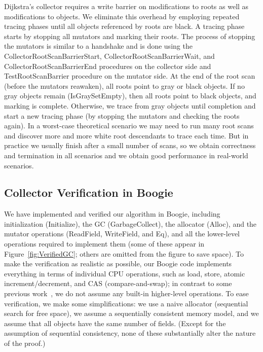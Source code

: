 Dijkstra's collector requires a write barrier on modifications to roots as well as modifications to objects. 
We eliminate this overhead by employing repeated tracing 
phases until all objects referenced by roots are black. 
A tracing phase starts by stopping all mutators and marking their roots. 
The process of stopping the mutators is similar to a handshake and is done using the CollectorRootScanBarrierStart, CollectorRootScanBarrierWait, and CollectorRootScanBarrierEnd procedures on the collector side and TestRootScanBarrier procedure on the mutator side. 
At the end of the root scan (before the mutators reawaken), all roots point to gray or black objects.
If no gray objects remain (IsGraySetEmpty), then all roots point to black objects, and marking is complete. 
Otherwise, we trace from gray objects until completion and start a new
tracing phase (by stopping the mutators and checking the roots again). 
In a worst-case theoretical scenario we may need to run many root scans and discover more and more white root descendants to trace each time. 
But in practice we usually finish after a small number of scans,
so we obtain correctness and termination in all scenarios and we obtain good performance in real-world scenarios. 

\subsection{Collector Verification in Boogie}
\label{sec:gc-verify}

We have implemented and verified our algorithm in Boogie,
including initialization (Initialize), the GC (GarbageCollect), the allocator (Alloc),
and the mutator operations (ReadField, WriteField, and Eq),
and all the lower-level operations required to implement them (some of these appear
in Figure~\ref{fig:VerifiedGC}; others are omitted from the figure to save space).
To make the verification as realistic as possible,
our Boogie code implements everything in terms of individual CPU operations,
such as load, store, atomic increment/decrement, and CAS (compare-and-swap);
in contrast to some previous work~\cite{gont96},
we do not assume any built-in higher-level operations.
To ease verification, we make some simplifications:
we use a naive allocator (sequential search for free space),
we assume a sequentially consistent memory model,
and we assume that all objects have the same number of fields.
(Except for the assumption of sequential consistency, none of these substantially alter the nature of the proof.)

